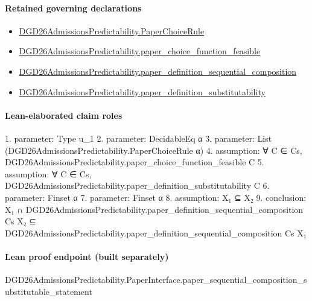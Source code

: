 \documentclass[10pt]{article}
\begin{document}
\paragraph{Retained governing declarations}
\begin{itemize}\raggedright
\item \hyperlink{governing-declaration-4678951b4432b184}{DGD26\allowbreak{}Admissions\allowbreak{}Predictability.\allowbreak{}Paper\allowbreak{}Choice\allowbreak{}Rule}
\item \hyperlink{governing-declaration-f7de74a44053f6d5}{DGD26\allowbreak{}Admissions\allowbreak{}Predictability.\allowbreak{}paper\_\allowbreak{}choice\_\allowbreak{}function\_\allowbreak{}feasible}
\item \hyperlink{governing-declaration-c10b5862fabcb2c0}{DGD26\allowbreak{}Admissions\allowbreak{}Predictability.\allowbreak{}paper\_\allowbreak{}definition\_\allowbreak{}sequential\_\allowbreak{}composition}
\item \hyperlink{governing-declaration-39cdd64a379d386b}{DGD26\allowbreak{}Admissions\allowbreak{}Predictability.\allowbreak{}paper\_\allowbreak{}definition\_\allowbreak{}substitutability}
\end{itemize}
\paragraph{Lean-elaborated claim roles}\begin{ReviewVerbatim}
1. parameter: Type u_1
2. parameter: DecidableEq α
3. parameter: List (DGD26AdmissionsPredictability.PaperChoiceRule α)
4. assumption: ∀ C ∈ Cs, DGD26AdmissionsPredictability.paper_choice_function_feasible C
5. assumption: ∀ C ∈ Cs, DGD26AdmissionsPredictability.paper_definition_substitutability C
6. parameter: Finset α
7. parameter: Finset α
8. assumption: X₁ ⊆ X₂
9. conclusion: X₁ ∩ DGD26AdmissionsPredictability.paper_definition_sequential_composition Cs X₂ ⊆
  DGD26AdmissionsPredictability.paper_definition_sequential_composition Cs X₁
\end{ReviewVerbatim}

\paragraph{Lean proof endpoint (built separately)}\begin{ReviewVerbatim}
DGD26AdmissionsPredictability.PaperInterface.paper_sequential_composition_substitutable_statement
\end{ReviewVerbatim}
\end{document}
